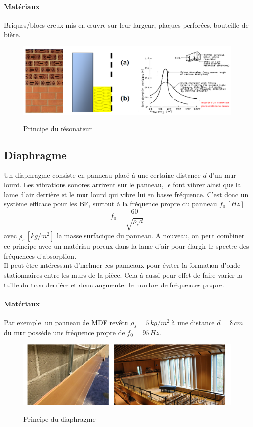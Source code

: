 \documentclass[11pt]{report}
\begin{document}
\paragraph{Matériaux } Briques/blocs creux mis en œuvre sur leur largeur, plaques perforées, bouteille de bière.

\begin{figure}[ht]
\centering
\includegraphics[width=0.8\linewidth]{reso}
\label{abb}
\caption{Principe du résonateur}
\end{figure}



\subsection{Diaphragme}
Un diaphragme consiste en panneau placé à une certaine distance $d$ d'un mur lourd. Les vibrations sonores arrivent sur le panneau, le font vibrer ainsi que la lame d'air derrière et le mur lourd qui vibre lui en basse fréquence. C'est donc un système efficace pour les BF, surtout à la fréquence propre du panneau $f_0\,[Hz]$
$$f_0 = \frac{60}{\sqrt{\rho_s d}}$$ 
avec $\rho_s\,[kg/m^2]$ la masse surfacique du panneau. A nouveau, on peut combiner ce principe avec un matériau poreux dans la lame d'air pour élargir le spectre des fréquences d'absorption.\\

Il peut être intéressant d'incliner ces panneaux pour éviter la formation d'onde stationnaires entre les murs de la pièce. Cela à aussi pour effet de faire varier la taille du trou derrière et donc augmenter le nombre de fréquences propre.

\paragraph{Matériaux} Par exemple, un panneau de MDF revêtu $\rho_s=5\,kg/m^2$ à une distance $d=8\,cm$ du mur possède une fréquence propre de $f_0 = 95\,Hz$.

\begin{figure}[ht]
\centering
\includegraphics[width=0.6\linewidth]{diaph}
\label{abc}
\caption{Principe du diaphragme}
\end{figure}
\end{document}
